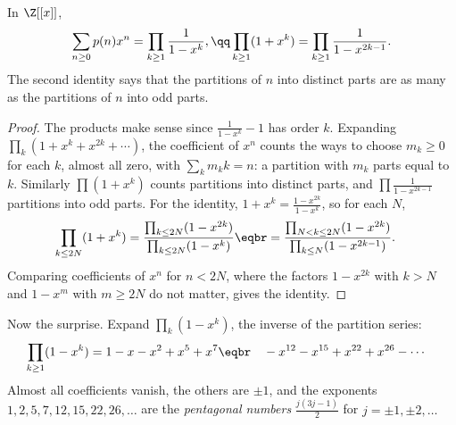 \begin{proposition}[Euler]\label{prop:eulerproduct}
In $\Z[[x]]$,
\[
\begin{gathered}\sum_{n\ge0}p(n)x^n=\prod_{k\ge1}\frac1{1-x^k},\qq\prod_{k\ge1}(1+x^k)=\prod_{k\ge1}\frac1{1-x^{2k-1}}.\end{gathered}
\]
The second identity says that the partitions of $n$ into distinct parts are as many as the partitions of $n$ into odd
parts.
\end{proposition}
\begin{proof}
The products make sense since $\frac1{1-x^k}-1$ has order $k$. Expanding $\prod_k(1+x^k+x^{2k}+\cdots)$, the coefficient of
$x^n$ counts the ways to choose $m_k\ge0$ for each $k$, almost all zero, with $\sum_km_kk=n$: a partition with $m_k$ parts
equal to $k$. Similarly $\prod(1+x^k)$ counts partitions into distinct parts, and $\prod\frac1{1-x^{2k-1}}$ partitions into odd
parts. For the identity, $1+x^k=\frac{1-x^{2k}}{1-x^k}$, so for each $N$,
\[
\begin{aligned}\prod_{k\le2N}(1+x^k)&=\frac{\prod_{k\le2N}(1-x^{2k})}{\prod_{k\le2N}(1-x^k)}\eqbr=\frac{\prod_{N<k\le2N}(1-x^{2k})}{\prod_{k\le N}(1-x^{2k-1})}.\end{aligned}
\]
Comparing coefficients of $x^n$ for $n<2N$, where the factors $1-x^{2k}$ with $k>N$ and $1-x^m$ with $m\ge2N$ do not
matter, gives the identity.
\end{proof}

Now the surprise. Expand $\prod_k(1-x^k)$, the inverse of the partition series:
\[
\begin{aligned}\prod_{k\ge1}(1-x^k)&=1-x-x^2+x^5+x^7\eqbr\quad-x^{12}-x^{15}+x^{22}+x^{26}-\cdots\end{aligned}
\]
Almost all coefficients vanish, the others are $\pm1$, and the exponents $1,2,5,7,12,15,\allowbreak22,26,\dots$ are the
\emph{pentagonal numbers} $\frac{j(3j-1)}2$ for $j=\pm1,\pm2,\dots$

